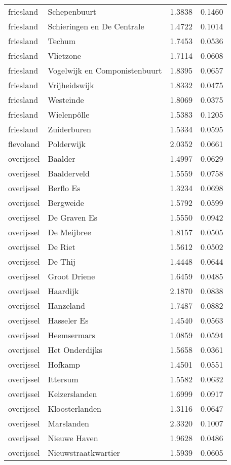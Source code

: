 \begin{longtable}{llcc}
friesland & Schepenbuurt & 1.3838 & 0.1460 \\
friesland & Schieringen en De Centrale & 1.4722 & 0.1014 \\
friesland & Techum & 1.7453 & 0.0536 \\
friesland & Vlietzone & 1.7114 & 0.0608 \\
friesland & Vogelwijk en Componistenbuurt & 1.8395 & 0.0657 \\
friesland & Vrijheidswijk & 1.8332 & 0.0475 \\
friesland & Westeinde & 1.8069 & 0.0375 \\
friesland & Wielenpôlle & 1.5383 & 0.1205 \\
friesland & Zuiderburen & 1.5334 & 0.0595 \\
flevoland & Polderwijk & 2.0352 & 0.0661 \\
overijssel & Baalder & 1.4997 & 0.0629 \\
overijssel & Baalderveld & 1.5559 & 0.0758 \\
overijssel & Berflo Es & 1.3234 & 0.0698 \\
overijssel & Bergweide & 1.5792 & 0.0599 \\
overijssel & De Graven Es & 1.5550 & 0.0942 \\
overijssel & De Meijbree & 1.8157 & 0.0505 \\
overijssel & De Riet & 1.5612 & 0.0502 \\
overijssel & De Thij & 1.4448 & 0.0644 \\
overijssel & Groot Driene & 1.6459 & 0.0485 \\
overijssel & Haardijk & 2.1870 & 0.0838 \\
overijssel & Hanzeland & 1.7487 & 0.0882 \\
overijssel & Hasseler Es & 1.4540 & 0.0563 \\
overijssel & Heemsermars & 1.0859 & 0.0594 \\
overijssel & Het Onderdijks & 1.5658 & 0.0361 \\
overijssel & Hofkamp & 1.4501 & 0.0551 \\
overijssel & Ittersum & 1.5582 & 0.0632 \\
overijssel & Keizerslanden & 1.6999 & 0.0917 \\
overijssel & Kloosterlanden & 1.3116 & 0.0647 \\
overijssel & Marslanden & 2.3320 & 0.1007 \\
overijssel & Nieuwe Haven & 1.9628 & 0.0486 \\
overijssel & Nieuwstraatkwartier & 1.5939 & 0.0605 \\

\end{longtable}

